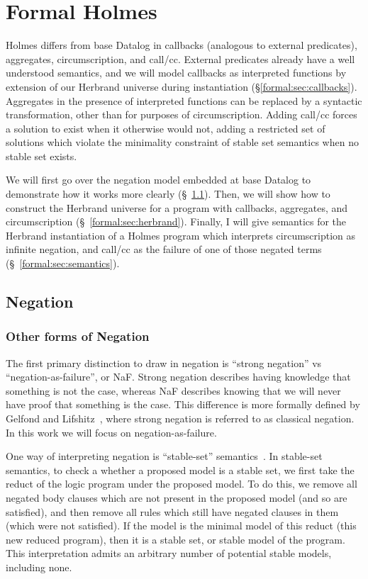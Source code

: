 
\chapter{Formal Holmes}
\label{chap:formal}
Holmes differs from base Datalog in callbacks (analogous to external predicates), aggregates, circumscription, and call/cc.
External predicates already have a well understood semantics, and we will model callbacks as interpreted functions by extension of our Herbrand universe during instantiation (\S \ref{formal:sec:callbacks}).
Aggregates in the presence of interpreted functions can be replaced by a syntactic transformation, other than for purposes of circumscription.
Adding call/cc forces a solution to exist when it otherwise would not, adding a restricted set of solutions which violate the minimality constraint of stable set semantics when no stable set exists.

We will first go over the negation model embedded at base Datalog to demonstrate how it works more clearly (\S~\ref{formal:sec:negation}).
Then, we will show how to construct the Herbrand universe for a program with callbacks, aggregates, and circumscription (\S~\ref{formal:sec:herbrand}).
Finally, I will give semantics for the Herbrand instantiation of a Holmes program which interprets circumscription as infinite negation, and call/cc as the failure of one of those negated terms (\S~\ref{formal:sec:semantics}).
\section{Negation}
\label{formal:sec:negation}
\subsection{Other forms of Negation}
The first primary distinction to draw in negation is ``strong negation'' vs ``negation-as-failure'', or NaF.
Strong negation describes having knowledge that something is not the case, whereas NaF describes knowing that we will never have proof that something is the case.
This difference is more formally defined by Gelfond and Lifshitz~\cite{strongneg}, where strong negation is referred to as classical negation.
In this work we will focus on negation-as-failure.

One way of interpreting negation is ``stable-set'' semantics~\cite{stablemodel}.
In stable-set semantics, to check a whether a proposed model is a stable set, we first take the reduct of the logic program under the proposed model.
To do this, we remove all negated body clauses which are not present in the proposed model (and so are satisfied), and then remove all rules which still have negated clauses in them (which were not satisfied).
If the model is the minimal model of this reduct (this new reduced program), then it is a stable set, or stable model of the program.
This interpretation admits an arbitrary number of potential stable models, including none.

